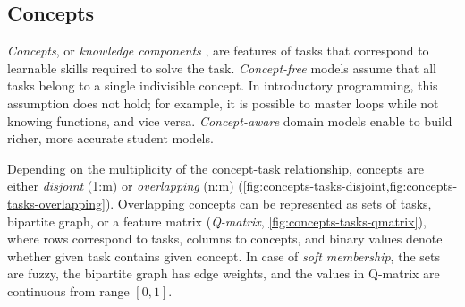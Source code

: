 \subsection{Concepts}

\emph{Concepts}, or \emph{knowledge components} \cite{knowledge-components},
are features of tasks that correspond to learnable skills %
required to solve the task.
\emph{Concept-free} models assume that all
tasks belong to a single indivisible concept.
In introductory programming, this assumption does not hold;
for example, it is possible to master loops while not knowing functions,
and vice versa.
\emph{Concept-aware} domain models
enable to build richer, more accurate student models.


Depending on the multiplicity of the concept-task relationship,
concepts are either \emph{disjoint} (1:m) or \emph{overlapping} (n:m)
(\cref{fig:concepts-tasks-disjoint,fig:concepts-tasks-overlapping}).
Overlapping concepts can be represented as sets of tasks, bipartite graph,
or a feature matrix (\emph{Q-matrix}, \cref{fig:concepts-tasks-qmatrix}),
where rows correspond to tasks, columns to concepts,
and binary values denote whether given task contains given concept. %
In case of \emph{soft membership}, the sets are fuzzy, the bipartite graph has
edge weights, and the values in Q-matrix are continuous from range $[0, 1]$.


